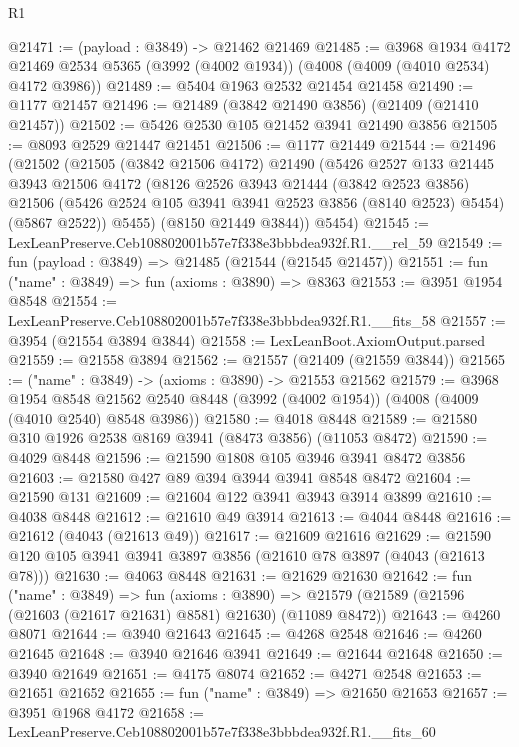 \begin{lexlean}{R1}
\begin{coremodule}
@21471 := (payload : @3849) -> @21462 @21469
@21485 := @3968
    @1934
    @4172
    @21469
    @2534
    @5365
    (@3992 (@4002 @1934))
    (@4008 (@4009 (@4010 @2534) @4172 @3986))
@21489 := @5404 @1963 @2532 @21454 @21458
@21490 := @1177 @21457
@21496 := @21489 (@3842 @21490 @3856) (@21409 (@21410 @21457))
@21502 := @5426 @2530 @105 @21452 @3941 @21490 @3856
@21505 := @8093 @2529 @21447 @21451
@21506 := @1177 @21449
@21544 := @21496
    (@21502
      (@21505
        (@3842 @21506 @4172)
        @21490
        (@5426
          @2527
          @133
          @21445
          @3943
          @21506
          @4172
          (@8126
            @2526
            @3943
            @21444
            (@3842 @2523 @3856)
            @21506
            (@5426 @2524 @105 @3941 @3941 @2523 @3856 (@8140 @2523) @5454)
            (@5867 @2522))
          @5455)
        (@8150 @21449 @3844))
      @5454)
@21545 := LexLeanPreserve.Ceb108802001b57e7f338e3bbbdea932f.R1.__rel_59
@21549 := fun (payload : @3849) => @21485 (@21544 (@21545 @21457))
@21551 := fun ("name" : @3849) => fun (axioms : @3890) => @8363
@21553 := @3951 @1954 @8548
@21554 := LexLeanPreserve.Ceb108802001b57e7f338e3bbbdea932f.R1.__fits_58
@21557 := @3954 (@21554 @3894 @3844)
@21558 := LexLeanBoot.AxiomOutput.parsed
@21559 := @21558 @3894
@21562 := @21557 (@21409 (@21559 @3844))
@21565 := ("name" : @3849) -> (axioms : @3890) -> @21553 @21562
@21579 := @3968
    @1954
    @8548
    @21562
    @2540
    @8448
    (@3992 (@4002 @1954))
    (@4008 (@4009 (@4010 @2540) @8548 @3986))
@21580 := @4018 @8448
@21589 := @21580 @310 @1926 @2538 @8169 @3941 (@8473 @3856) (@11053 @8472)
@21590 := @4029 @8448
@21596 := @21590 @1808 @105 @3946 @3941 @8472 @3856
@21603 := @21580 @427 @89 @394 @3944 @3941 @8548 @8472
@21604 := @21590 @131
@21609 := @21604 @122 @3941 @3943 @3914 @3899
@21610 := @4038 @8448
@21612 := @21610 @49 @3914
@21613 := @4044 @8448
@21616 := @21612 (@4043 (@21613 @49))
@21617 := @21609 @21616
@21629 := @21590 @120 @105 @3941 @3941 @3897 @3856 (@21610 @78 @3897 (@4043 (@21613 @78)))
@21630 := @4063 @8448
@21631 := @21629 @21630
@21642 := fun ("name" : @3849) =>
  fun (axioms : @3890) =>
  @21579 (@21589 (@21596 (@21603 (@21617 @21631) @8581) @21630) (@11089 @8472))
@21643 := @4260 @8071
@21644 := @3940 @21643
@21645 := @4268 @2548
@21646 := @4260 @21645
@21648 := @3940 @21646 @3941
@21649 := @21644 @21648
@21650 := @3940 @21649
@21651 := @4175 @8074
@21652 := @4271 @2548
@21653 := @21651 @21652
@21655 := fun ("name" : @3849) => @21650 @21653
@21657 := @3951 @1968 @4172
@21658 := LexLeanPreserve.Ceb108802001b57e7f338e3bbbdea932f.R1.__fits_60

\end{coremodule}
\end{lexlean}
